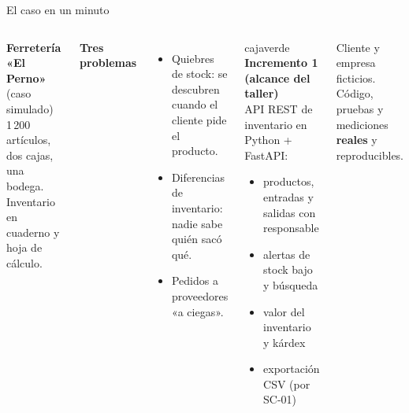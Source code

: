 \documentclass[aspectratio=169,11pt]{beamer}
\newcommand{\caja}[3]{\begin{beamercolorbox}[wd=\dimexpr\linewidth-12pt\relax,sep=6pt,rounded=true]{#1}#3\end{beamercolorbox}}
\begin{document}
\begin{frame}{El caso en un minuto}
\begin{columns}[T,onlytextwidth]
\textbf{Ferretería «El Perno»} (caso simulado)\\[0.1cm]
{\small 1\,200 artículos, dos cajas, una bodega. Inventario en cuaderno y hoja de cálculo.}
\vspace{0.3cm}

\textbf{Tres problemas}
\begin{itemize}\small
  \item Quiebres de stock: se descubren cuando el cliente pide el producto.
  \item Diferencias de inventario: nadie sabe quién sacó qué.
  \item Pedidos a proveedores «a ciegas».
\end{itemize}
\caja{cajaverde}{}{\small
\textbf{Incremento 1 (alcance del taller)}\\[0.1cm]
API REST de inventario en Python + FastAPI:
\begin{itemize}\footnotesize
  \item productos, entradas y salidas con responsable
  \item alertas de stock bajo y búsqueda
  \item valor del inventario y kárdex
  \item exportación CSV (por SC-01)
\end{itemize}}
\vspace{0.15cm}
{\footnotesize\color{gristexto}Cliente y empresa ficticios. Código, pruebas y mediciones \textbf{reales} y reproducibles.}
\end{columns}
\end{frame}
\end{document}
